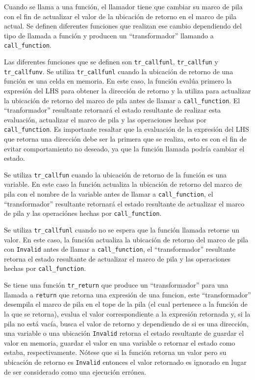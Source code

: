 Cuando se llama a una función, el llamador tiene que cambiar su marco de pila con el fin de actualizar el valor de la ubicación de retorno en el marco de pila actual.
Se definen diferentes funciones que realizan ese cambio dependiendo del tipo de llamada a función y producen un ``transformador'' llamando a \verb|call_function|.

Las diferentes funciones que se definen son \verb|tr_callfunl|, \verb|tr_callfun| y \verb|tr_callfunv|.
Se utiliza \verb|tr_callfunl| cuando la ubicación de retorno de una función es una celda en memoria.
En este caso, la función evalúa primero la expresión del LHS para obtener la dirección de retorno y la utiliza para actualizar la ubicación de retorno del marco de pila antes de llamar a \verb|call_function|.
El ``tranformador'' resultante retornará el estado resultante de realizar esta evaluación, actualizar el marco de pila y las operaciones hechas por \verb|call_function|.
Es importante resaltar que la evaluación de la expresión del LHS que retorna una dirección debe ser la primera que se realiza, esto es con el fin de evitar comportamiento no deseado, ya que la función llamada podría cambiar el estado.

Se utiliza \verb|tr_callfun| cuando la ubicación de retorno de la función es una variable.
En este caso la función actualiza la ubicación de retorno del marco de pila con el nombre de la variable antes de llamar a \verb|call_function|, el ``transformador'' resultante retornará el estado resultante de actualizar el marco de pila y las operaciónes hechas por \verb|call_function|.

Se utiliza \verb|tr_callfunl| cuando no se espera que la función llamada retorne un valor.
En este caso, la función actualiza la ubicación de retorno del marco de pila con \verb|Invalid| antes de llamar a \verb|call_function|, el ``transformador'' resultante retorna el estado resultante de actualizar el marco de pila y las operaciones hechas por \verb|call_function|.

Se tiene una función \verb|tr_return| que produce un ``transformador'' para una llamada a \verb|return| que retorna una expresión de una funcion, este ``transformador'' desempila el marco de pila en el tope de la pila (el cual pertenece a la función de la que se retorna), evalua el valor correspondiente a la expresión retornada y, si la pila no está vacía, busca el valor de retorno y dependiendo de si es una dirección, una variable o una ubicación \verb|Invalid| retorna el estado resultante de guardar el valor en memoria, guardar el valor en una variable o retornar el estado como estaba, respectivamente.
Nótese que si la función retorna un valor pero su ubicación de retorno es \verb|Invalid| entonces el valor retornado es ignorado en lugar de ser considerado como una ejecución errónea.

